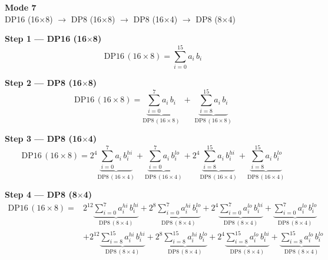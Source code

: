 \documentclass[fleqn]{article}
\newcommand{\DPop}[3]{\mathrm{DP#1}\,(#2\!\times\!#3)}
\begin{document}
\begin{center}
{\LARGE \textbf{Mode 7}}\\[4pt]
{\large DP16 (16$\times$8) $\rightarrow$ DP8 (16$\times$8) $\rightarrow$ DP8 (16$\times$4) $\rightarrow$ DP8 (8$\times$4)}
\end{center}

\vspace{4em}

\noindent\textbf{Step 1 --- DP16 (16$\times$8)}
\[
\DPop{16}{16}{8} = \sum_{i=0}^{15} a_i \, b_i
\]

\vspace{0.5em}

\noindent\textbf{Step 2 --- DP8 (16$\times$8)}
\[
\DPop{16}{16}{8}
  = \underbrace{\sum_{i=0}^{7} a_i \, b_i}_{\DPop{8}{16}{8}}
  \; + \; \underbrace{\sum_{i=8}^{15} a_i \, b_i}_{\DPop{8}{16}{8}}
\]

\vspace{0.5em}

\noindent\textbf{Step 3 --- DP8 (16$\times$4)}
\[
\DPop{16}{16}{8}
  = 2^{4} \underbrace{\sum_{i=0}^{7} a_i \, b_i^{hi}}_{\DPop{8}{16}{4}}
  + \underbrace{\sum_{i=0}^{7} a_i \, b_i^{lo}}_{\DPop{8}{16}{4}}
  + 2^{4} \underbrace{\sum_{i=8}^{15} a_i \, b_i^{hi}}_{\DPop{8}{16}{4}}
  + \underbrace{\sum_{i=8}^{15} a_i \, b_i^{lo}}_{\DPop{8}{16}{4}}
\]

\vspace{0.5em}

\noindent\textbf{Step 4 --- DP8 (8$\times$4)}
\begin{align*}
\DPop{16}{16}{8} = {}
  & 2^{12} \underbrace{\sum_{i=0}^{7} a_i^{hi} \, b_i^{hi}}_{\DPop{8}{8}{4}}
  + 2^{8} \underbrace{\sum_{i=0}^{7} a_i^{hi} \, b_i^{lo}}_{\DPop{8}{8}{4}}
  + 2^{4} \underbrace{\sum_{i=0}^{7} a_i^{lo} \, b_i^{hi}}_{\DPop{8}{8}{4}}
  + \underbrace{\sum_{i=0}^{7} a_i^{lo} \, b_i^{lo}}_{\DPop{8}{8}{4}} \\[1em]
  & + 2^{12} \underbrace{\sum_{i=8}^{15} a_i^{hi} \, b_i^{hi}}_{\DPop{8}{8}{4}}
  + 2^{8} \underbrace{\sum_{i=8}^{15} a_i^{hi} \, b_i^{lo}}_{\DPop{8}{8}{4}}
  + 2^{4} \underbrace{\sum_{i=8}^{15} a_i^{lo} \, b_i^{hi}}_{\DPop{8}{8}{4}}
  + \underbrace{\sum_{i=8}^{15} a_i^{lo} \, b_i^{lo}}_{\DPop{8}{8}{4}}
\end{align*}
\end{document}
